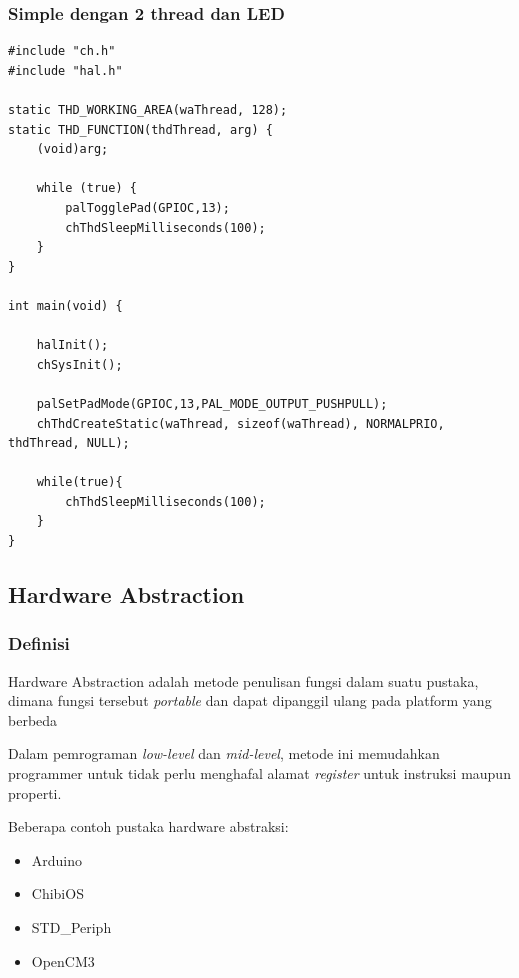 \documentclass[table,dvipsnames]{beamer}
\begin{document}
		\begin{frame}[fragile]
		\frametitle{Simple dengan 2 thread dan LED}
		\begin{exampleblock}{}
			\begin{verbatim}
#include "ch.h"
#include "hal.h"

static THD_WORKING_AREA(waThread, 128);
static THD_FUNCTION(thdThread, arg) {
	(void)arg;

	while (true) {
		palTogglePad(GPIOC,13);
		chThdSleepMilliseconds(100);
	}
}

int main(void) {

	halInit();
	chSysInit();

	palSetPadMode(GPIOC,13,PAL_MODE_OUTPUT_PUSHPULL);
	chThdCreateStatic(waThread, sizeof(waThread), NORMALPRIO, thdThread, NULL);

	while(true){
		chThdSleepMilliseconds(100);
	}
}
			\end{verbatim}
		\end{exampleblock}
	\end{frame}

	\subsection{Hardware Abstraction}
	\begin{frame}
		\frametitle{Definisi}
		\begin{exampleblock}{}
			Hardware Abstraction adalah metode penulisan fungsi dalam suatu pustaka, dimana fungsi tersebut \textit{portable}
			dan dapat dipanggil ulang pada platform yang berbeda
		\end{exampleblock}

		\begin{exampleblock}{}
			Dalam pemrograman \textit{low-level} dan \textit{mid-level}, metode ini memudahkan programmer untuk tidak perlu
			menghafal alamat \textit{register} untuk instruksi maupun properti.
		\end{exampleblock}

		\begin{exampleblock}{}
			Beberapa contoh pustaka hardware abstraksi:
			\begin{itemize}
				\item Arduino
				\item ChibiOS
				\item STD\_Periph
				\item OpenCM3
			\end{itemize}
		\end{exampleblock}
	\end{frame}
\end{document}
